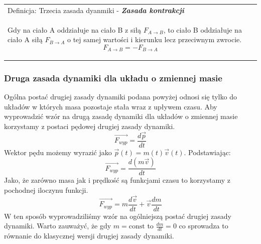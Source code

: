 \documentclass[a4paper]{article}
\newenvironment{definition}[2][Definicja]
    {
        \begin{center}
        \begin{tabular}{|p{1\textwidth}|}
        \hline
            #1: #2\\[2ex]
        \begin{em}
        \Large
    }
    { 
        \end{em}
        \\\hline
        \end{tabular} 
        \end{center}
    }
\begin{document}
    \begin{definition}{Trzecia zasada dyanmiki - \textbf{\em{Zasada kontrakcji}}}
        Gdy na ciało A oddziałuje na ciało B z siłą $F_{A \rightarrow B}$, to ciało B 
        oddziałuje na ciało A siłą $F_{B \rightarrow A}$ o tej samej wartości i kierunku lecz
        przeciwnym zwrocie.
        \[F_{A \rightarrow B} = -F_{B \rightarrow A}\]
    \end{definition}

    \subsubsection*{\Large Druga zasada dynamiki dla układu o zmiennej masie}
    Ogólna postać drugiej zasady dynamiki podana powyżej odnosi się tylko do układów
    w których masa pozostaje stała wraz z upływem czasu. Aby wyprowadzić wzór na drugą zasadę 
    dynamiki dla układów o zmiennej masie korzystamy z postaci pędowej drugiej zasady dynamiki.
    \[\vec{F_{wyp}} = \frac{d\vec{p}}{dt}\]
    Wektor pędu możemy wyrazić jako $\vec{p}(t) = m(t)\vec{v}(t)$. Podstawiając:
    \[\vec{F_{wyp}} = \frac{d(m\vec{v})}{dt}\]
    Jako, że zarówno masa jak i prędkość są funkcjami czasu to korzystamy z pochodnej iloczynu
    funkcji.
    \[\vec{F_{wyp}} = m\frac{d\vec{v}}{dt} + \vec{v}\frac{dm}{dt}\]
    W ten sposób wyprowadziliśmy wzór na ogólniejszą postać drugiej zasady dynamiki. Warto 
    zauważyć, że gdy $m = \text{const}$ to $\frac{dm}{dt} = 0$ co sprowadza to równanie 
    do klasycznej wersji drugiej zasady dynamiki.
\end{document}
